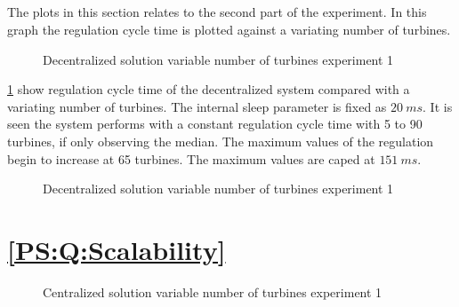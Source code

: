 \subsection{}
The plots in this section relates to the second part of the  experiment. In this graph the regulation cycle time is plotted against a variating number of turbines.

\begin{figure}[h]
	\centering
	
	\caption{Decentralized solution variable number of turbines experiment 1}
	\label{fig:exp:decen:turbines}
\end{figure}

\cref{fig:exp:decen:turbines} show regulation cycle time of the decentralized system compared with a variating number of turbines. The internal sleep parameter is fixed as $20~ms.$
It is seen the system performs with a constant regulation cycle time with 5 to 90 turbines, if only observing the median. The maximum values of the regulation begin to increase at 65 turbines. The maximum values are caped at $151~ms.$

\begin{figure}[h]
	\centering
	
	\caption{Decentralized solution variable number of turbines experiment 1}
	\label{fig:exp:decen:turbines_cache}
\end{figure}

\section{\ref{PS:Q:Scalability}}

\begin{figure}[h]
	\centering
	
	\caption{Centralized solution variable number of turbines experiment 1}
	\label{fig:exp:cen:turbines}
\end{figure}

